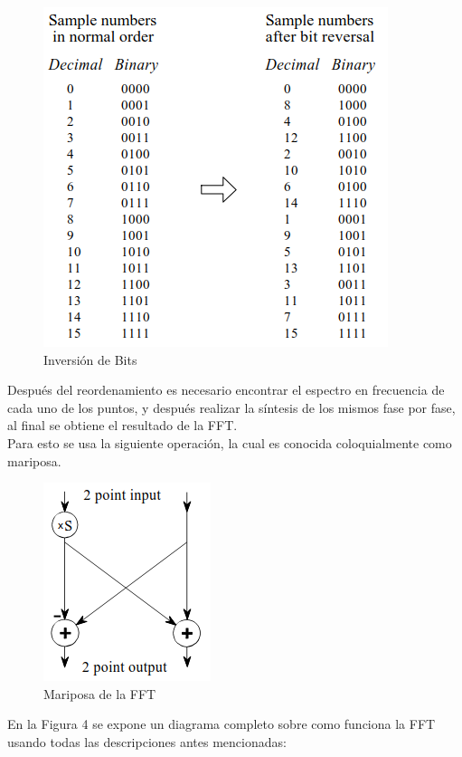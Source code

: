 \begin{figure}[H]
	\centering
	\includegraphics[scale=.8]{img/bit.png}
	\caption{Inversión de Bits}
	\label{fig:prebSsDa}		
\end{figure}
Después del reordenamiento es necesario encontrar el espectro en frecuencia de cada uno de los puntos, y después realizar la síntesis de los mismos fase por fase, al final se obtiene el resultado de la FFT.\\ Para esto se usa la siguiente operación, la cual es conocida coloquialmente como mariposa.
\begin{figure}[H]
	\centering
	\includegraphics[scale=.82]{img/mariposa.png}
	\caption{Mariposa de la FFT}
	\label{fig:prebsDa}		
\end{figure}
En la Figura 4 se expone un diagrama completo sobre como funciona la FFT usando todas las descripciones antes mencionadas:
